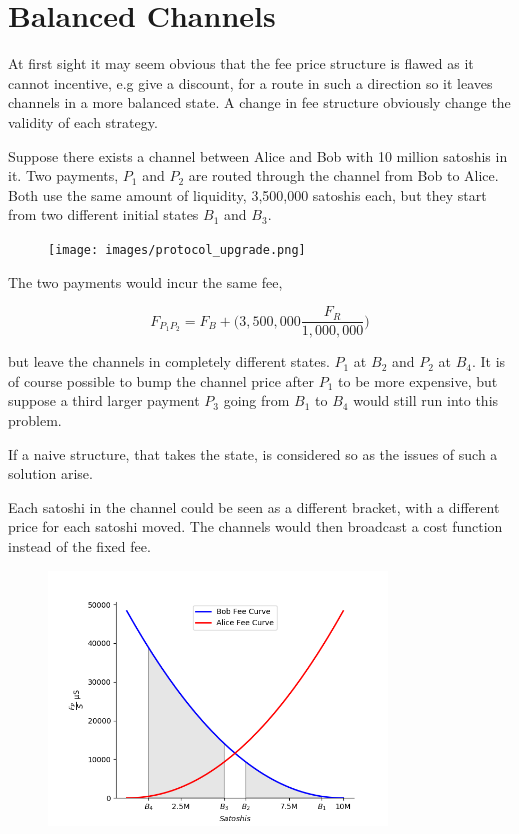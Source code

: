 \section{Balanced Channels}

At first sight it may seem obvious that the fee price structure is flawed as it cannot incentive, e.g give a discount, for a route in such a direction so it leaves channels in a more balanced state. A change in fee structure obviously change the validity of each strategy.

Suppose there exists a channel between Alice and Bob with 10 million satoshis in it. 
Two payments, $P_{1}$ and $P_{2}$ are routed through the channel from Bob to Alice.
Both use the same amount of liquidity, 3,500,000 satoshis each, but they start from two different initial states $B_{1}$ and $B_3$.

\begin{figure}[!htb]
	\hspace*{0.7cm} 
	\centering
	\texttt{[image: images/protocol\_upgrade.png]}
	
	\label{fig:upgrade}
	\hspace*{2mm} 	
\end{figure}

The two payments would incur the same fee, 

\[ F_{P_1 P_2} = F_B + \Big(3,500,000\dfrac{F_R}{1,000,000}\Big) \]

but leave the channels in completely different states. $P_1$ at $B_2$ and $P_2$ at $B_4$. It is of course possible to bump the channel price after $P_1$ to
be more expensive, but suppose a third larger payment $P_3$ going from $B_1$ to $B_4$ would still run into this problem.

If a naive structure, that takes the state, is considered so as the issues of such a solution arise. 

Each satoshi in the channel could be seen as a different bracket, with a different price for each satoshi moved. The channels would then broadcast a cost function instead of the fixed fee.

\begin{figure}[!htb]
	\hspace*{-0.5cm}
	\centering
	\includegraphics[width=9cm]{images/fee_scheme.png}
	\label{fig:fee scheme}
	\hspace{2mm}
\end{figure}


